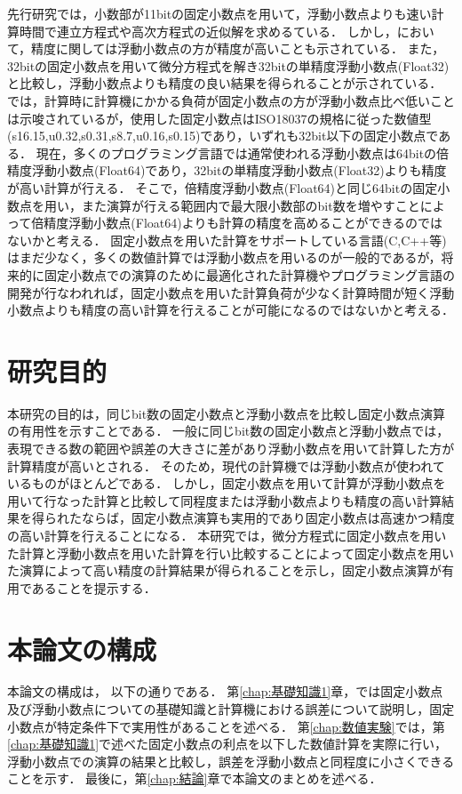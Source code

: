先行研究では，小数部が11bitの固定小数点を用いて，浮動小数点よりも速い計算時間で連立方程式や高次方程式の近似解を求めるている\cite{IJERTV12IS010134}．
しかし，\cite{IJERTV12IS010134}において，精度に関しては浮動小数点の方が精度が高いことも示されている．
また，32bitの固定小数点を用いて微分方程式を解き32bitの単精度浮動小数点(Float32)と比較し，浮動小数点よりも精度の良い結果を得られることが示されている\cite{hopkins2020stochastic}．
\cite{hopkins2020stochastic}では，計算時に計算機にかかる負荷が固定小数点の方が浮動小数点比べ低いことは示唆されているが，使用した固定小数点はISO18037の規格に従った数値型(s16.15,u0.32,s0.31,s8.7,u0.16,s0.15)であり，いずれも32bit以下の固定小数点である．
現在，多くのプログラミング言語では通常使われる浮動小数点は64bitの倍精度浮動小数点(Float64)であり，32bitの単精度浮動小数点(Float32)よりも精度が高い計算が行える．
そこで，倍精度浮動小数点(Float64)と同じ64bitの固定小数点を用い，また演算が行える範囲内で最大限小数部のbit数を増やすことによって倍精度浮動小数点(Float64)よりも計算の精度を高めることができるのではないかと考える．
固定小数点を用いた計算をサポートしている言語(C,C++等)はまだ少なく，多くの数値計算では浮動小数点を用いるのが一般的であるが，将来的に固定小数点での演算のために最適化された計算機やプログラミング言語の開発が行なわれれば，固定小数点を用いた計算負荷が少なく計算時間が短く浮動小数点よりも精度の高い計算を行えることが可能になるのではないかと考える．

\section{研究目的}
本研究の目的は，同じbit数の固定小数点と浮動小数点を比較し固定小数点演算の有用性を示すことである．
一般に同じbit数の固定小数点と浮動小数点では，表現できる数の範囲や誤差の大きさに差があり浮動小数点を用いて計算した方が計算精度が高いとされる．
そのため，現代の計算機では浮動小数点が使われているものがほとんどである．
しかし，固定小数点を用いて計算が浮動小数点を用いて行なった計算と比較して同程度または浮動小数点よりも精度の高い計算結果を得られたならば，固定小数点演算も実用的であり固定小数点は高速かつ精度の高い計算を行えることになる．
本研究では，微分方程式に固定小数点を用いた計算と浮動小数点を用いた計算を行い比較することによって固定小数点を用いた演算によって高い精度の計算結果が得られることを示し，固定小数点演算が有用であることを提示する．

\section{本論文の構成}
本論文の構成は， 以下の通りである．
第\ref{chap:基礎知識1}章，では固定小数点及び浮動小数点についての基礎知識と計算機における誤差について説明し，固定小数点が特定条件下で実用性があることを述べる．
第\ref{chap:数値実験}では，第\ref{chap:基礎知識1}で述べた固定小数点の利点を以下した数値計算を実際に行い，浮動小数点での演算の結果と比較し，誤差を浮動小数点と同程度に小さくできることを示す．
最後に，第\ref{chap:結論}章で本論文のまとめを述べる．
